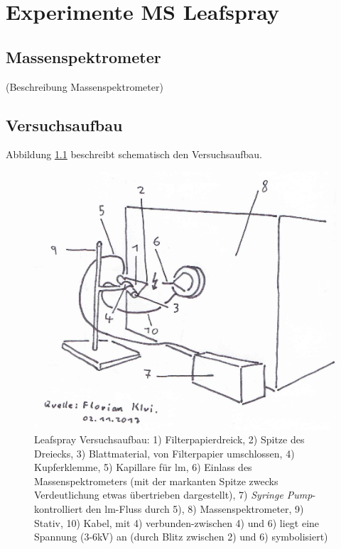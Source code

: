\chapter{Experimente MS Leafspray}

\section{Massenspektrometer}

(Beschreibung Massenspektrometer)

\section{Versuchsaufbau} \label{sec:Versuchsaufbau}

Abbildung \ref{fig:LeafsprayVersuchsaufbau} beschreibt schematisch den Versuchsaufbau. 

\begin{figure}[!hbtp]
  \centering
  \includegraphics[scale=0.5]{figures/Kapitel4/VWA_MSLeafspray_Versuchsaufbau.png}
  \caption[Leafspray Versuchsaufbau, Quelle: Author]{Leafspray Versuchsaufbau: 1) Filterpapierdreick, 2) Spitze des Dreiecks, 3) Blattmaterial, von Filterpapier umschlossen, 4) Kupferklemme, 5) Kapillare für \gls{lm}, 6) Einlass des Massenspektrometers (mit der markanten Spitze zwecks Verdeutlichung etwas übertrieben dargestellt), 7) \textit{Syringe Pump}-kontrolliert den \gls{lm}-Fluss durch 5), 8) Massenspektrometer, 9) Stativ, 10) Kabel, mit 4) verbunden-zwischen 4) und 6) liegt eine Spannung (3-6kV) an (durch Blitz zwischen 2) und 6) symbolisiert)}
  \label{fig:LeafsprayVersuchsaufbau}
\end{figure}

